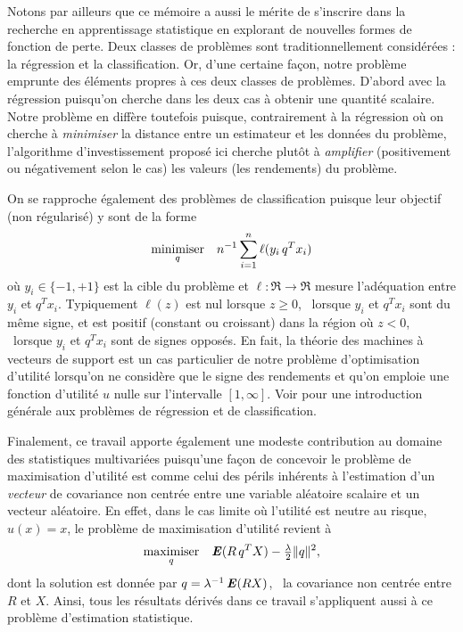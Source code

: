 Notons par ailleurs que ce mémoire a aussi le mérite de s'inscrire dans la recherche en
apprentissage statistique en explorant de nouvelles formes de fonction de perte. Deux
classes de problèmes sont traditionnellement considérées : la régression et la
classification. Or, d'une certaine façon, notre problème emprunte des éléments propres à
ces deux classes de problèmes. D'abord avec la régression puisqu'on cherche dans les deux
cas à obtenir une quantité scalaire. Notre problème en diffère toutefois puisque,
contrairement à la régression où on cherche à \textit{minimiser} la distance entre un
estimateur et les données du problème, l'algorithme d'investissement proposé ici cherche
plutôt à \textit{amplifier} (positivement ou négativement selon le cas) les valeurs (les
rendements) du problème. 

On se rapproche également des problèmes de classification puisque leur objectif (non
régularisé) y sont de la forme
\begin{equation}
  \minimizeEquation[q]{n^{-1}\sumi\ell(y_i\,q^Tx_i)}
\end{equation}
où $y_i\in\{-1,+1\}$ est la cible du problème et $\ell:\Re\to\Re$ mesure l'adéquation entre
$y_i$ et $q^Tx_i$. Typiquement $\ell(z)$ est nul lorsque $z\ge0$, \ie\ lorsque $y_i$ et
$q^Tx_i$ sont du même signe, et est positif (constant ou croissant) dans la région où
$z<0$, \ie\ lorsque $y_i$ et $q^Tx_i$ sont de signes opposés. En fait, la théorie des
machines à vecteurs de support est un cas particulier de notre problème d'optimisation
d'utilité lorsqu'on ne considère que le signe des rendements et qu'on emploie une fonction
d'utilité $u$ nulle sur l'intervalle $[1,\infty]$. Voir \cite{mohri2012foundations} pour une
introduction générale aux problèmes de régression et de classification.

Finalement, ce travail apporte également une modeste contribution au domaine des
statistiques multivariées puisqu'une façon de concevoir le problème de maximisation
d'utilité est comme celui des périls inhérents à l'estimation d'un \textit{vecteur} de
covariance non centrée entre une variable aléatoire scalaire et un vecteur aléatoire. En
effet, dans le cas limite où l'utilité est neutre au risque, \ie\ $u(x) = x$, le problème
de maximisation d'utilité revient à
\begin{equation}
  \maximizeEquation[q]{\E(R\,q^TX) - \tfrac{\lambda}{2}\|q\|^2,}
\end{equation}
dont la solution est donnée par $q =  \lambda^{-1}\E(RX)$, \ie\ la covariance non centrée
entre $R$ et $X$. Ainsi, tous les résultats dérivés dans ce travail s'appliquent aussi à
ce problème d'estimation statistique.



